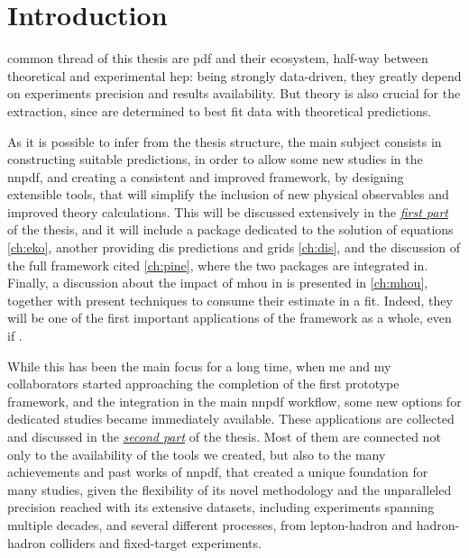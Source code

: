

\chapter*{Introduction}
%
	{}

 common thread of this thesis are \acrfull{pdf} and their
ecosystem, half-way between theoretical and experimental \acrfull{hep}: being
strongly data-driven, they greatly depend on experiments precision and results
availability.
But theory is also crucial for the extraction, since  are
determined to best fit data with theoretical predictions.

As it is possible to infer from the thesis structure, the main subject consists
in constructing suitable predictions, in order to allow some new studies
in the \acrlong{nnpdf}, and creating a consistent and improved framework, by
designing extensible tools, that will simplify the inclusion of new physical
observables and improved theory calculations.
This will be discussed extensively in the \hyperref[part:th]{\textit{first
part}} of the thesis, and it will include a package dedicated to the solution
of \dglap equations \cref{ch:eko}, another providing \acrfull{dis} predictions
and grids \cref{ch:dis}, and the discussion of the full framework cited
\cref{ch:pine}, where the two packages are integrated in.
Finally, a discussion about the impact of \acrlong{mhou} in \pdf is presented
in \cref{ch:mhou}, together with present techniques to consume their estimate
in a \nnpdf fit. Indeed, they will be one of the first important applications
of the framework as a whole, even if .

While this has been the main focus for a long time, when me and my
collaborators started approaching the completion of the first prototype
framework, and the integration in the main \acrshort{nnpdf} workflow, some new
options for dedicated studies became immediately available.
These applications are collected and discussed in the
\hyperref[part:app]{\textit{second part}} of the thesis.
Most of them are connected not only to the availability of the tools we
created, but also to the many achievements and past works of \acrshort{nnpdf},
that created a unique foundation for many studies, given the flexibility of its
novel methodology and the unparalleled precision reached with its extensive
datasets, including experiments spanning multiple decades, and several
different processes, from lepton-hadron and hadron-hadron colliders and
fixed-target experiments.


